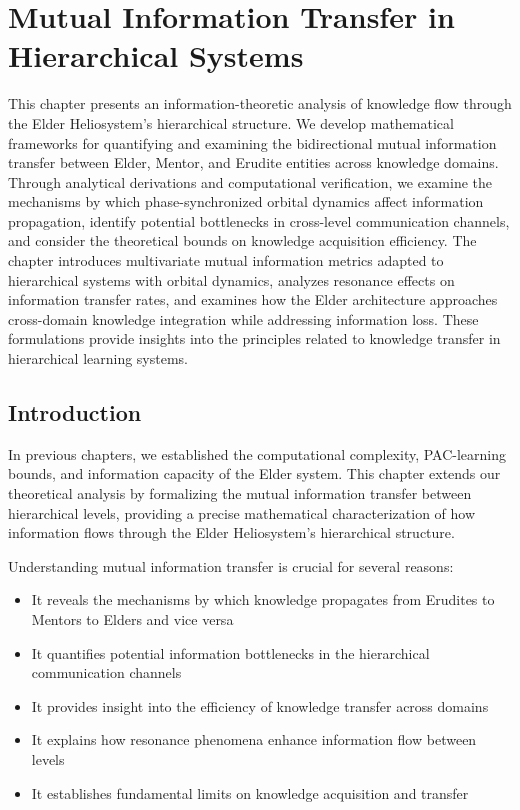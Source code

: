 \chapter{Mutual Information Transfer in Hierarchical Systems}

\begin{tcolorbox}[colback=DarkSkyBlue!5!white,colframe=DarkSkyBlue!75!black,title=Chapter Summary]
This chapter presents an information-theoretic analysis of knowledge flow through the Elder Heliosystem's hierarchical structure. We develop mathematical frameworks for quantifying and examining the bidirectional mutual information transfer between Elder, Mentor, and Erudite entities across knowledge domains. Through analytical derivations and computational verification, we examine the mechanisms by which phase-synchronized orbital dynamics affect information propagation, identify potential bottlenecks in cross-level communication channels, and consider the theoretical bounds on knowledge acquisition efficiency. The chapter introduces multivariate mutual information metrics adapted to hierarchical systems with orbital dynamics, analyzes resonance effects on information transfer rates, and examines how the Elder architecture approaches cross-domain knowledge integration while addressing information loss. These formulations provide insights into the principles related to knowledge transfer in hierarchical learning systems.
\end{tcolorbox}

\section{Introduction}

In previous chapters, we established the computational complexity, PAC-learning bounds, and information capacity of the Elder system. This chapter extends our theoretical analysis by formalizing the mutual information transfer between hierarchical levels, providing a precise mathematical characterization of how information flows through the Elder Heliosystem's hierarchical structure.

Understanding mutual information transfer is crucial for several reasons:

\begin{itemize}
    \item It reveals the mechanisms by which knowledge propagates from Erudites to Mentors to Elders and vice versa
    \item It quantifies potential information bottlenecks in the hierarchical communication channels
    \item It provides insight into the efficiency of knowledge transfer across domains
    \item It explains how resonance phenomena enhance information flow between levels
    \item It establishes fundamental limits on knowledge acquisition and transfer
\end{itemize}

